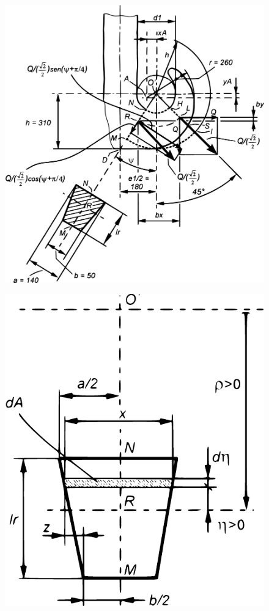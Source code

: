 \begin{figure}
\centering
\begin{minipage}{.63\textwidth}
  \centering
  \includegraphics[width=.7\linewidth]{imgs/Cap5/92 SolidoFitt}
  \label{fig:solidoFittizio}
\end{minipage}%
\begin{minipage}{.33\textwidth}
  \centering
  \includegraphics[width=.7\linewidth]{imgs/chiTrap}
  \label{fig:chiTrapezio}
\end{minipage}
\end{figure} 

